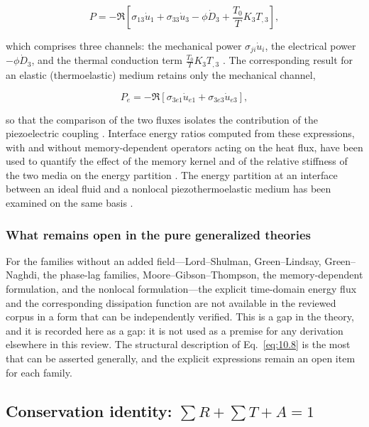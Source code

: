 \begin{equation}
P = -\Re\left[\sigma_{13}\dot{u}_1 + \sigma_{33}\dot{u}_3 - \phi\dot{D}_3 + \frac{T_0}{T}K_3 T_{,3}\right],
\label{eq:10.9}
\end{equation}

which comprises three channels: the mechanical power $\sigma_{ji}\dot{u}_i$, the electrical power $-\phi\dot{D}_3$, and the thermal conduction term $\frac{T_0}{T}K_3 T_{,3}$ \cite{Barak2023IJP,Barak2023JTS}. The corresponding result for an elastic (thermoelastic) medium retains only the mechanical channel,

\begin{equation}
P_e = -\Re\left[\sigma_{3e1}\dot{u}_{e1} + \sigma_{3e3}\dot{u}_{e3}\right],
\label{eq:10.10}
\end{equation}

so that the comparison of the two fluxes isolates the contribution of the piezoelectric coupling \cite{Barak2023,Gupta2023Energy}. Interface energy ratios computed from these expressions, with and without memory-dependent operators acting on the heat flux, have been used to quantify the effect of the memory kernel and of the relative stiffness of the two media on the energy partition \cite{Barak2023,Barak2023MMMS,Kumar2023PhysScr}. The energy partition at an interface between an ideal fluid and a nonlocal piezothermoelastic medium has been examined on the same basis \cite{Gupta2023IJNMF}.

\subsubsection{What remains open in the pure generalized theories}

For the families without an added field---Lord--Shulman, Green--Lindsay, Green--Naghdi, the phase-lag families, Moore--Gibson--Thompson, the memory-dependent formulation, and the nonlocal formulation---the explicit time-domain energy flux and the corresponding dissipation function are not available in the reviewed corpus in a form that can be independently verified. This is a gap in the theory, and it is recorded here as a gap: it is not used as a premise for any derivation elsewhere in this review. The structural description of Eq.~\eqref{eq:10.8} is the most that can be asserted generally, and the explicit expressions remain an open item for each family.

\subsection{Conservation identity: $\sum R + \sum T + A = 1$}
\label{sec:10.5}

